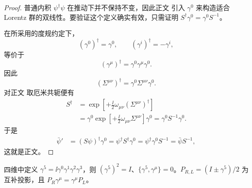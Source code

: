 \begin{proof}
普通内积 $\psi^\dagger\psi$ 在推动下并不保持不变，因此正文 引入 $\gamma^0$ 来构造适合 Lorentz 群的双线性。要验证这个定义确实有效，只需证明 $S^\dagger\gamma^0=\gamma^0S^{-1}$。

在所采用的度规约定下，
\begin{equation*}
 (\gamma^0)^\dagger=\gamma^0,
 \qquad
 (\gamma^i)^\dagger=-\gamma^i,
\end{equation*}
等价于
\begin{equation*}
 (\gamma^\mu)^\dagger=\gamma^0\gamma^\mu\gamma^0.
\end{equation*}
因此
\begin{equation*}
 (\Sigma^{\mu\nu})^\dagger=\gamma^0\Sigma^{\mu\nu}\gamma^0.
\end{equation*}
对正文 取厄米共轭便有
\begin{align*}
 S^\dagger
 &=\exp\!\left[+\frac{\ii}{2}\omega_{\mu\nu}(\Sigma^{\mu\nu})^\dagger\right]\\
 &=\gamma^0\exp\!\left[+\frac{\ii}{2}\omega_{\mu\nu}\Sigma^{\mu\nu}\right]\gamma^0
 =\gamma^0S^{-1}\gamma^0.
\end{align*}
于是
\begin{align*}
 \bar\psi'
 &=(S\psi)^\dagger\gamma^0
 =\psi^\dagger S^\dagger\gamma^0
 =\psi^\dagger\gamma^0S^{-1}
 =\bar\psi S^{-1},
\end{align*}
这就是正文。
\end{proof}

\begin{lemma}[手征投影的代数]
四维中定义 $\gamma^5=\ii\gamma^0\gamma^1\gamma^2\gamma^3$，则 $(\gamma^5)^2=I$、$\{\gamma^5,\gamma^\mu\}=0$。$P_{R,L}=(I\pm\gamma^5)/2$ 为互补投影，且 $P_R\gamma^\mu=\gamma^\mu P_L$。
\end{lemma}

